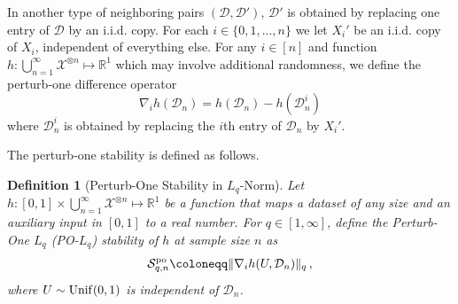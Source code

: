 \documentclass[11pt]{article}
\theoremstyle{plain}
\newtheorem{definition}[theorem]{Definition}
\newcommand{\D}{{\mathcal{D}}}
\renewcommand{\S}{{\mathcal{S}}}
\newcommand{\X}{{\mathcal{X}}}
\begin{document}
In another type of neighboring pairs $(\D,\D')$, $\D'$ is obtained by replacing one entry of $\D$ by an i.i.d. copy.  
For each $i\in\{0,1,...,n\}$ we let $X_i'$ be an i.i.d. copy of $X_i$, independent of everything else.  For any $i\in[n]$ and function $h:\bigcup_{n=1}^\infty \X^{\otimes n}\mapsto\mathbb R^1$ which may involve additional randomness, we define the perturb-one difference operator
\begin{equation}\label{eq:2.2-nabla}
\nabla_i h(\D_n) = h(\D_n) - h(\D_n^i)
\end{equation}
where $\D_n^i$ is obtained by replacing the $i$th entry of $\D_n$ by $X_i'$.

The perturb-one stability is defined as follows.
\begin{definition}[Perturb-One Stability in $L_q$-Norm]\label{def:2.2-po-stab-lq}
    Let $h:[0,1]\times \bigcup_{n=1}^\infty \X^{\otimes n}\mapsto\mathbb R^1$ be a  function that maps a dataset of any size and an auxiliary input in $[0,1]$ to a real number. 
For $q\in[1,\infty]$, define the Perturb-One $L_q$ (PO-$L_q$) stability of $h$ at sample size $n$ as
    $$
\S_{q,n}^{\rm po}   \coloneqq \|\nabla_i h(U,\D_n)\|_q\,,
    $$
    where $U\sim {\rm Unif}(0,1)$ is independent of $\D_n$.
\end{definition}
\end{document}
